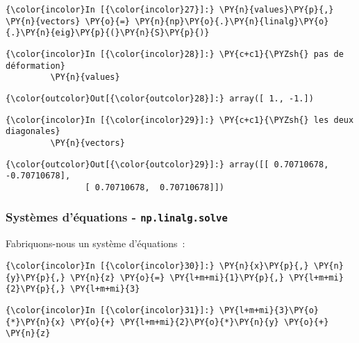     \begin{Verbatim}[commandchars=\\\{\}]
{\color{incolor}In [{\color{incolor}27}]:} \PY{n}{values}\PY{p}{,} \PY{n}{vectors} \PY{o}{=} \PY{n}{np}\PY{o}{.}\PY{n}{linalg}\PY{o}{.}\PY{n}{eig}\PY{p}{(}\PY{n}{S}\PY{p}{)}
\end{Verbatim}


    \begin{Verbatim}[commandchars=\\\{\}]
{\color{incolor}In [{\color{incolor}28}]:} \PY{c+c1}{\PYZsh{} pas de déformation}
         \PY{n}{values}
\end{Verbatim}


\begin{Verbatim}[commandchars=\\\{\}]
{\color{outcolor}Out[{\color{outcolor}28}]:} array([ 1., -1.])
\end{Verbatim}
            
    \begin{Verbatim}[commandchars=\\\{\}]
{\color{incolor}In [{\color{incolor}29}]:} \PY{c+c1}{\PYZsh{} les deux diagonales}
         \PY{n}{vectors}
\end{Verbatim}


\begin{Verbatim}[commandchars=\\\{\}]
{\color{outcolor}Out[{\color{outcolor}29}]:} array([[ 0.70710678, -0.70710678],
                [ 0.70710678,  0.70710678]])
\end{Verbatim}
            
    \hypertarget{systuxe8mes-duxe9quations---np.linalg.solve}{%
\subsubsection{\texorpdfstring{Systèmes d'équations -
\texttt{np.linalg.solve}}{Systèmes d'équations - np.linalg.solve}}\label{systuxe8mes-duxe9quations---np.linalg.solve}}

    Fabriquons-nous un système d'équations~:

    \begin{Verbatim}[commandchars=\\\{\}]
{\color{incolor}In [{\color{incolor}30}]:} \PY{n}{x}\PY{p}{,} \PY{n}{y}\PY{p}{,} \PY{n}{z} \PY{o}{=} \PY{l+m+mi}{1}\PY{p}{,} \PY{l+m+mi}{2}\PY{p}{,} \PY{l+m+mi}{3}
\end{Verbatim}


    \begin{Verbatim}[commandchars=\\\{\}]
{\color{incolor}In [{\color{incolor}31}]:} \PY{l+m+mi}{3}\PY{o}{*}\PY{n}{x} \PY{o}{+} \PY{l+m+mi}{2}\PY{o}{*}\PY{n}{y} \PY{o}{+} \PY{n}{z}
\end{Verbatim}


